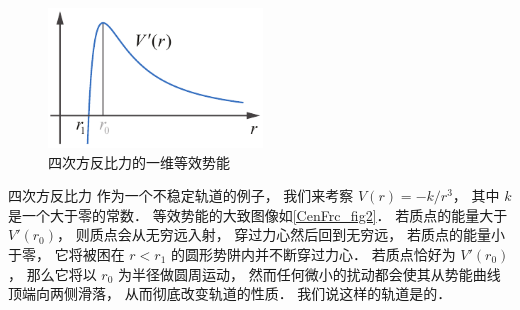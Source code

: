 \begin{figure}[ht]
\centering
\includegraphics[width=5.7cm]{./figures/CenFrc2.pdf}
\caption{四次方反比力的一维等效势能} \label{CenFrc_fig2}
\end{figure}

\begin{exam}{四次方反比力}
作为一个不稳定轨道的例子， 我们来考察 $V(r) = -k/r^3$， 其中 $k$ 是一个大于零的常数． 等效势能的大致图像如\autoref{CenFrc_fig2}． 若质点的能量大于 $V'(r_0)$， 则质点会从无穷远入射， 穿过力心然后回到无穷远， 若质点的能量小于零， 它将被困在 $r < r_1$ 的圆形势阱内并不断穿过力心． 若质点恰好为 $V'(r_0)$， 那么它将以 $r_0$ 为半径做圆周运动， 然而任何微小的扰动都会使其从势能曲线顶端向两侧滑落， 从而彻底改变轨道的性质． 我们说这样的轨道是的．
\end{exam}

